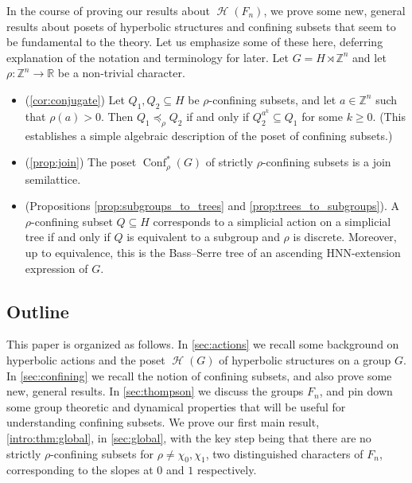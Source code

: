 \documentclass[reqno,12pt]{amsart}\setcounter{tocdepth}{1}
\theoremstyle{definition}
\newcommand{\Z}{\mathbb{Z}}
\newcommand{\R}{\mathbb{R}}
\DeclareMathOperator{\Hyp}{\mathcal{H}}
\DeclareMathOperator{\Conf}{Conf}
\numberwithin{equation}{section}
\begin{document}
In the course of proving our results about $\Hyp(F_n)$, we prove some new, general results about posets of hyperbolic structures and confining subsets that seem to be fundamental to the theory. Let us emphasize some of these here, deferring explanation of the notation and terminology for later. Let $G = H \rtimes \Z^n$ and let $\rho \colon \Z^n \to \R$ be a non-trivial character.
\begin{itemize}
    \item (\cref{cor:conjugate}) Let $Q_1,Q_2\subseteq H$ be $\rho$-confining subsets, and let $a\in \Z^n$ such that $\rho(a)>0$. Then $Q_1\preceq_\rho Q_2$ if and only if $Q_2^{a^k}\subseteq Q_1$ for some $k\ge 0$. (This establishes a simple algebraic description of the poset of confining subsets.)
    \item (\cref{prop:join}) The poset $\Conf^\ast_\rho(G)$ of strictly $\rho$-confining subsets is a join semilattice.
    \item (Propositions \ref{prop:subgroups_to_trees} and \ref{prop:trees_to_subgroups}). A $\rho$-confining subset $Q \subseteq H$ corresponds to a simplicial action on a simplicial tree if and only if $Q$ is equivalent to a subgroup and $\rho$ is discrete. Moreover, up to equivalence, this is the Bass--Serre tree of an ascending HNN-extension expression of $G$.
\end{itemize}

\subsection*{Outline} This paper is organized as follows. In \cref{sec:actions} we recall some background on hyperbolic actions and the poset $\Hyp(G)$ of hyperbolic structures on a group $G$. In \cref{sec:confining} we recall the notion of confining subsets, and also prove some new, general results. In \cref{sec:thompson} we discuss the groups $F_n$, and pin down some group theoretic and dynamical properties that will be useful for understanding confining subsets. We prove our first main result, \cref{intro:thm:global}, in \cref{sec:global}, with the key step being that there are no strictly $\rho$-confining subsets for $\rho \neq \chi_0, \chi_1$, two distinguished characters of $F_n$, corresponding to the slopes at $0$ and $1$ respectively. 
\end{document}
